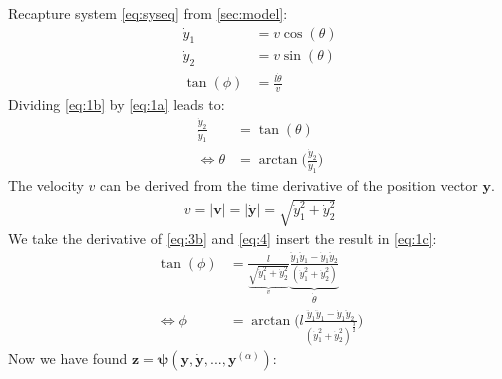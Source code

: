 \documentclass[a4paper,11pt,headings=standardclasses]{scrartcl}%
\newcommand{\y}{\mathbf{y}}
\newcommand{\z}{\mathbf{z}}
\begin{document}
Recapture system \eqref{eq:syseq} from \autoref{sec:model}:
\setcounter{equation}{0}
\begin{subequations}
\label{eq:1}
\begin{align}
\dot{y}_1&=v \cos (\theta) \label{eq:1a}\\
\dot{y}_2&=v \sin (\theta) \label{eq:1b}\\
\tan(\phi) &= \frac{l\dot{\theta}}{v} \label{eq:1c}
\end{align}
\end{subequations}
\setcounter{equation}{2}
Dividing \eqref{eq:1b} by \eqref{eq:1a} leads to:
\begin{subequations}
\begin{align}
\frac{\dot{y}_2}{\dot{y}_1} &=\tan(\theta) \label{eq:3a}\\
\Leftrightarrow  \theta &= \arctan\Big(\frac{\dot{y}_2}{\dot{y}_1}\Big) \label{eq:3b}
\end{align}
\end{subequations}
The velocity $v$ can be derived from the time derivative of the position vector $\y$.
\begin{align}
\label{eq:4}
v =\left| \mathbf{v} \right| = \left| \dot{\y} \right| = \sqrt{\dot{y}_1^2+\dot{y}_2^2}
\end{align}
We take the derivative of \eqref{eq:3b} and \eqref{eq:4} insert the result in \eqref{eq:1c}:
\begin{subequations}
\begin{align}
\tan(\phi) &= \frac{l}{\underbrace{\sqrt{\dot{y}_1^2+\dot{y}_2^2}}_{v}} \underbrace{\frac{\ddot{y}_1 \ddot{y}_1 - \dot{y}_1 \ddot{y}_2}{(\dot{y}_1^2+\dot{y}_2^2)}}_{\dot{\theta}} \\
\Leftrightarrow \phi &= \arctan\Big(l \frac{\ddot{y}_1 \ddot{y}_1 - \dot{y}_1 \ddot{y}_2}{(\dot{y}_1^2+\dot{y}_2^2)^{\frac{3}{2}}} \Big)
\end{align}
\end{subequations}
Now we have found $\z = \mathbf{\psi}(\y,\dot{\y},...,\y^{(\alpha)})$:
\end{document}
